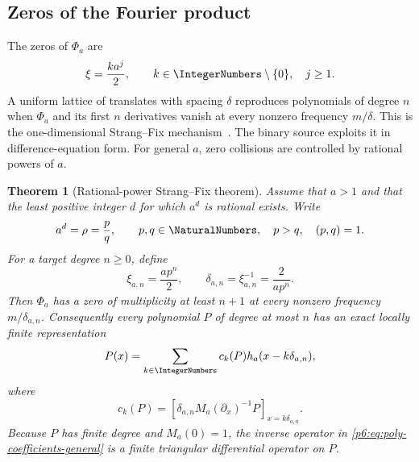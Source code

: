 \documentclass[11pt,oneside]{article}
\numberwithin{equation}{section}
\newtheorem{theorem}{Theorem}[section]
\theoremstyle{definition}
\theoremstyle{remark}
\begin{document}
\subsection{Zeros of the Fourier product}

The zeros of $\Phi_a$ are
\begin{equation}\label{p6:eq:Phi-zeros}
 \xi=\frac{k a^j}{2},
 \qquad k\in\IntegerNumbers\setminus\{0\},\quad j\ge1.
\end{equation}
A uniform lattice of translates with spacing $\delta$ reproduces polynomials of
degree $n$ when $\Phi_a$ and its first $n$ derivatives vanish at every nonzero
frequency $m/\delta$.  This is the one-dimensional Strang--Fix mechanism~\cite{p6:strang-fix,p6:deboor-ron}.  The
binary source exploits it in difference-equation form.  For general $a$, zero
collisions are controlled by rational powers of $a$.

\begin{theorem}[Rational-power Strang--Fix theorem]\label{p6:thm:rational-power-SF}
Assume that $a>1$ and that the least positive integer $d$ for which $a^d$ is
rational exists.  Write
\begin{equation}\label{p6:eq:rational-power}
 a^d=\rho=\frac pq,
 \qquad p,q\in\NaturalNumbers,\quad p>q,\quad (p,q)=1.
\end{equation}
For a target degree $n\ge0$, define
\begin{equation}\label{p6:eq:lattice-spacing}
 \xi_{a,n}=\frac{ap^n}{2},
 \qquad
 \delta_{a,n}=\xi_{a,n}^{-1}=\frac{2}{ap^n}.
\end{equation}
Then $\Phi_a$ has a zero of multiplicity at least $n+1$ at every nonzero
frequency $m/\delta_{a,n}$.  Consequently every polynomial $P$ of degree at most
$n$ has an exact locally finite representation
\begin{equation}\label{p6:eq:poly-reproduction-general}
 P(x)=\sum_{k\in\IntegerNumbers}c_k(P)
 h_a(x-k\delta_{a,n}),
\end{equation}
where
\begin{equation}\label{p6:eq:poly-coefficients-general}
 c_k(P)=
 \left[
 \delta_{a,n}M_a(\partial_x)^{-1}P
 \right]_{x=k\delta_{a,n}}.
\end{equation}
Because $P$ has finite degree and $M_a(0)=1$, the inverse operator in
\eqref{p6:eq:poly-coefficients-general} is a finite triangular differential
operator on $P$.
\end{theorem}
\end{document}
